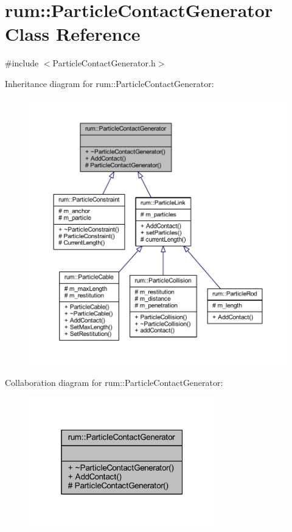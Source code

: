 \hypertarget{classrum_1_1_particle_contact_generator}{}\section{rum\+:\+:Particle\+Contact\+Generator Class Reference}
\label{classrum_1_1_particle_contact_generator}


{\ttfamily \#include $<$Particle\+Contact\+Generator.\+h$>$}



Inheritance diagram for rum\+:\+:Particle\+Contact\+Generator\+:\nopagebreak
\begin{figure}[H]
\begin{center}
\leavevmode
\includegraphics[width=350pt]{classrum_1_1_particle_contact_generator__inherit__graph}
\end{center}
\end{figure}


Collaboration diagram for rum\+:\+:Particle\+Contact\+Generator\+:\nopagebreak
\begin{figure}[H]
\begin{center}
\leavevmode
\includegraphics[width=229pt]{classrum_1_1_particle_contact_generator__coll__graph}
\end{center}
\end{figure}
